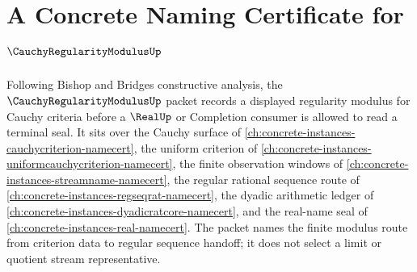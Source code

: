\chapter{A Concrete Naming Certificate for $\CauchyRegularityModulusUp$}
\label{ch:concrete-instances-cauchy-regularity-modulus-namecert}

Following Bishop and Bridges constructive analysis, the $\CauchyRegularityModulusUp$ packet records a displayed regularity modulus for Cauchy criteria before a $\RealUp$ or Completion consumer is allowed to read a terminal seal. It sits over the Cauchy surface of \autoref{ch:concrete-instances-cauchycriterion-namecert}, the uniform criterion of \autoref{ch:concrete-instances-uniformcauchycriterion-namecert}, the finite observation windows of \autoref{ch:concrete-instances-streamname-namecert}, the regular rational sequence route of \autoref{ch:concrete-instances-regseqrat-namecert}, the dyadic arithmetic ledger of \autoref{ch:concrete-instances-dyadicratcore-namecert}, and the real-name seal of \autoref{ch:concrete-instances-real-namecert}. The packet names the finite modulus route from criterion data to regular sequence handoff; it does not select a limit or quotient stream representative.

